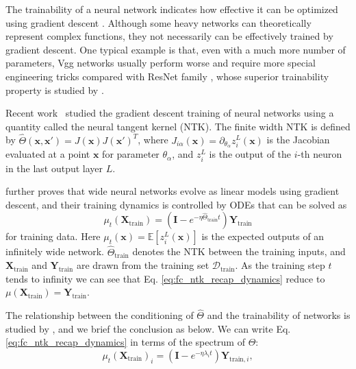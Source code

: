\documentclass{article} \usepackage{iclr2021_conference,times}
\newcommand{\finntk}{\hat\Theta}
\newcommand{\Id}{\textbf{I}}
\begin{document}
The trainability of a neural network indicates how effective it can be optimized using gradient descent \citep{burkholz2019initialization,hayou2019impact,shin2020trainability}. Although some heavy networks can theoretically represent complex functions, they not necessarily can be effectively trained by gradient descent. One typical example is that, even with a much more number of parameters, Vgg networks \citep{simonyan2014very} usually perform worse and require more special engineering tricks compared with ResNet family \citep{he2016deep}, whose superior trainability property is studied by \citet{yang2017mean}.

Recent work~\citep{jacot2018neural,lee2019wide,chizat2019lazy} studied the gradient descent training of neural networks using a quantity called the neural tangent kernel (NTK).
The finite width NTK is defined by $\finntk(\bm{x}, \bm{x}') = J(\bm{x})J(\bm{x}')^T$, where $J_{i\alpha}(\bm{x}) = \partial_{\theta_\alpha}z_i^L(\bm{x})$ is the Jacobian evaluated at a point $\bm{x}$ for parameter $\theta_\alpha$, and $z_i^L$ is the output of the $i$-th neuron in the last output layer $L$.

\citet{lee2019wide} further proves that wide neural networks evolve as linear models using gradient descent, and their training dynamics is controlled by ODEs that can be solved as
\begin{equation}
    \mu_t(\bm{X}_{\text{train}}) = (\Id - e^{-\eta\finntk_{\text{train}} t})\bm{Y}_{\text{train}} \label{eq:fc_ntk_recap_dynamics}
\end{equation}
\normalsize
for training data. Here $\mu_t(\bm{x}) = \mathbb E[z^L_i(\bm{x})]$ is the expected outputs of an infinitely wide network. $\finntk_{\text{train}}$ denotes the NTK between the training inputs, and $\bm{X}_{\text{train}}$ and $\bm{Y}_{\text{train}}$ are drawn from the training set $\mathcal{D}_{\text{train}}$.
As the training step $t$ tends to infinity we can see that Eq. \ref{eq:fc_ntk_recap_dynamics} reduce to $\mu(\bm{X}_{\text{train}}) = \bm{Y}_{\text{train}}$.

The relationship between the conditioning of $\finntk$ and the trainability of networks is studied by \citet{xiao2019disentangling}, and we brief the conclusion as below. We can write Eq. \ref{eq:fc_ntk_recap_dynamics} in terms of the spectrum of $\Theta$:
\begin{equation}\label{eq:fc_ntk_dynamics_eigen}
    \mu_t(\bm{X}_{\text{train}})_i = (\Id - e^{-\eta \lambda_i t}) \bm{Y}_{{\text{train}},i},
\end{equation}
\end{document}
